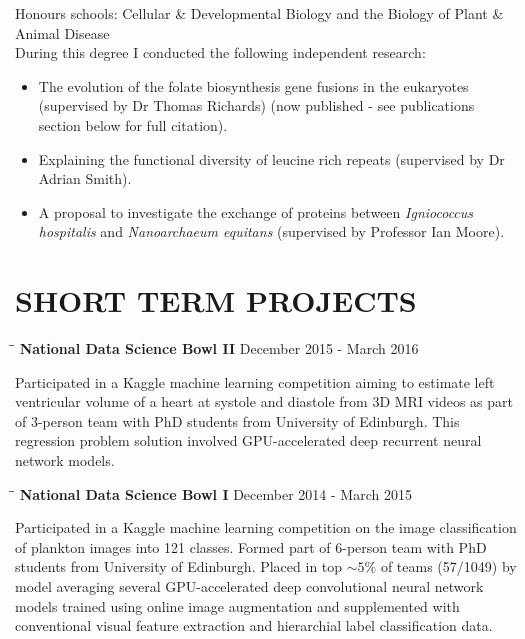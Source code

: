 \documentclass{res}
\begin{document}
\begin{resume}
\begin{tabbing}
   \end{tabbing}\vspace{-20pt}  
Honours schools: Cellular \& Developmental Biology and the Biology of Plant \& Animal Disease\\
During this degree I conducted the following independent research:
\begin{itemize}
        \vspace{-10pt}
    \item The evolution of the folate biosynthesis gene fusions in the eukaryotes (supervised by Dr Thomas Richards) (now published - see publications section below for full citation).
    \item Explaining the functional diversity of leucine rich repeats (supervised by Dr Adrian Smith).
    \item A proposal to investigate the exchange of proteins between  \emph{Igniococcus hospitalis} and  \emph{Nanoarchaeum equitans} (supervised by Professor Ian Moore).
\end{itemize}


\section{SHORT TERM PROJECTS}

   \vspace{-0.05in} 
   \begin{tabbing}
   \hspace{2in}\= \hspace{2.6in}\= \kill 
    {\bf National Data Science Bowl II} \> \>        December 2015 - March 2016\\
     \end{tabbing}\vspace{-20pt}      
     Participated in a Kaggle machine learning competition aiming to estimate left ventricular volume of a heart at systole and diastole from 3D MRI videos as 
     part of 3-person team with PhD students from University of Edinburgh. 
     This regression problem solution involved GPU-accelerated deep recurrent neural network models.

   \vspace{-0.1in} 

   \begin{tabbing}
   \hspace{2in}\= \hspace{2.6in}\= \kill 
   {\bf National Data Science Bowl I} \> \>        December 2014 - March 2015\\
     \end{tabbing}\vspace{-20pt}      
     Participated in a Kaggle machine learning competition on the image classification of plankton images into 121 classes. Formed part of 6-person team with PhD students from University of Edinburgh. 
     Placed in top $\sim5\%$ of teams (57/1049) by model averaging several GPU-accelerated deep convolutional neural network models trained using online image augmentation and supplemented with conventional visual feature extraction and hierarchial label classification data.
     

\end{resume}
\end{document}
